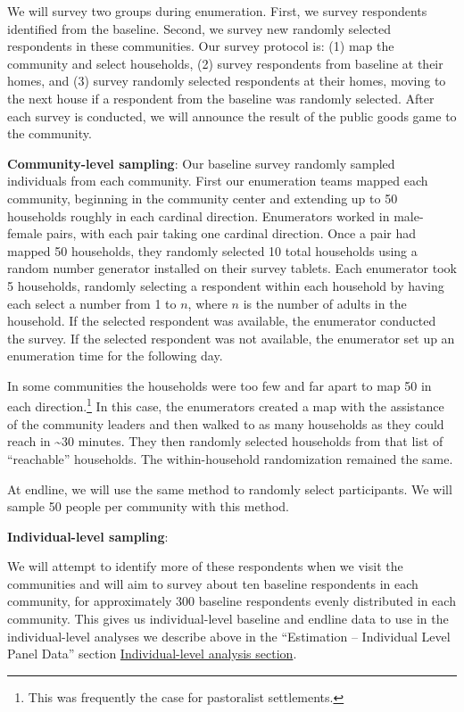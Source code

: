 \documentclass[
]{article}
\begin{document}
We will survey two groups during enumeration. First, we survey
respondents identified from the baseline. Second, we survey new randomly
selected respondents in these communities. Our survey protocol is: (1)
map the community and select households, (2) survey respondents from
baseline at their homes, and (3) survey randomly selected respondents at
their homes, moving to the next house if a respondent from the baseline
was randomly selected. After each survey is conducted, we will announce
the result of the public goods game to the community.

\textbf{Community-level sampling}: Our baseline survey randomly sampled
individuals from each community. First our enumeration teams mapped each
community, beginning in the community center and extending up to 50
households roughly in each cardinal direction. Enumerators worked in
male-female pairs, with each pair taking one cardinal direction. Once a
pair had mapped 50 households, they randomly selected 10 total
households using a random number generator installed on their survey
tablets. Each enumerator took 5 households, randomly selecting a
respondent within each household by having each select a number from 1
to \(n\), where \(n\) is the number of adults in the household. If the
selected respondent was available, the enumerator conducted the survey.
If the selected respondent was not available, the enumerator set up an
enumeration time for the following day.

In some communities the households were too few and far apart to map 50
in each direction.\footnote{This was frequently the case for pastoralist
  settlements.} In this case, the enumerators created a map with the
assistance of the community leaders and then walked to as many
households as they could reach in \textasciitilde30 minutes. They then
randomly selected households from that list of ``reachable'' households.
The within-household randomization remained the same.

At endline, we will use the same method to randomly select participants.
We will sample 50 people per community with this method.

\textbf{Individual-level sampling}:

We will attempt to identify more of these respondents when we visit the
communities and will aim to survey about ten baseline respondents in
each community, for approximately 300 baseline respondents evenly
distributed in each community. This gives us individual-level baseline
and endline data to use in the individual-level analyses we describe
above in the ``Estimation -- Individual Level Panel Data'' section
\protect\hyperlink{est_ind}{Individual-level analysis section}.
\end{document}
